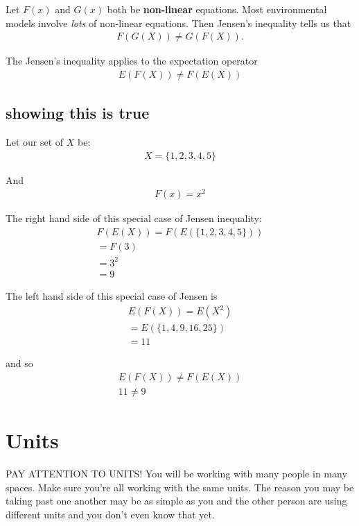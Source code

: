\documentclass{article}
\begin{document}
Let $F(x)$ and $G(x)$ both be \textbf{non-linear} equations. Most environmental models involve \textit{lots} of non-linear equations. Then Jensen's inequality tells us that 
\begin{align}
    F(G(X)) \neq G(F(X)).
\end{align}

The Jensen's inequality applies to the expectation operator 
\begin{align}
    E(F(X)) \neq F(E(X))
\end{align}

\subsection{showing this is true}

Let our set of $X$ be:
\begin{align}
    X = \{1, 2, 3, 4, 5\}
\end{align}

And 
\begin{align}
    F(x) = x^2
\end{align}

The right hand side of this special case of Jensen inequality:
\begin{align}
    F(E(X)) = F(E(\{1, 2, 3, 4, 5\}))\\
    = F(3) \\
    = 3^2 \\
    = 9
\end{align}

The left hand side of this special case of Jensen is 
\begin{align}
    E(F(X)) = E(X^2) \\
    = E(\{1, 4, 9, 16, 25\}) \\
    = 11
\end{align}

and so 
\begin{align}
    E(F(X)) \neq F(E(X))\\
    11 \neq 9
\end{align}

\section{Units}

PAY ATTENTION TO UNITS! You will be working with many people in many spaces. Make sure you're all working with the same units. The reason you may be taking past one another may be as simple as you and the other person are using different units and you don't even know that yet. 
\end{document}
